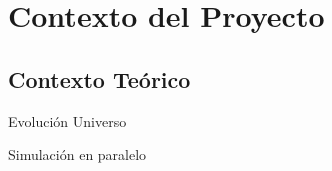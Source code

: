\documentclass{beamer}
\begin{document}
\section{Contexto del Proyecto}
\subsection{Contexto Teórico}
\begin{frame}{Evolución Universo}


\end{frame}
\begin{frame}{Simulación en paralelo}


\end{frame}
\end{document}
